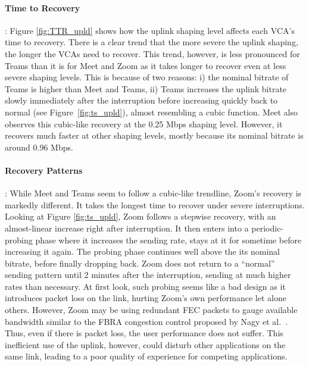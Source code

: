 \paragraph{Time to Recovery}: Figure \ref{fig:TTR_upld} shows how the uplink shaping level affects each VCA's time to recovery. There is a clear trend that the more severe the uplink shaping, the longer the VCAs need to recover. This trend, however, is less pronounced for Teams than it is for Meet and Zoom as it takes longer to recover even at less severe shaping levels. This is because of two reasons: i) the nominal bitrate of Teams is higher than Meet and Teams, ii)  Teams increases the uplink bitrate slowly immediately after the interruption before increasing quickly back to normal (see  Figure~\ref{fig:ts_upld}), almost resembling a cubic function. Meet also observes this cubic-like recovery at the 0.25 Mbps shaping level. However, it recovers much faster at other shaping levels, mostly because its nominal bitrate is around 0.96 Mbps. 

\paragraph{Recovery Patterns}: While Meet and Teams seem to follow a cubic-like trendline, Zoom's recovery is markedly different. It takes the longest time to recover under severe interruptions. Looking at Figure \ref{fig:ts_upld}, Zoom follows a stepwise recovery, with an almost-linear increase right after interruption. It then enters into a periodic-probing phase where it increases the sending rate, stays at it for sometime before increasing it again. The probing phase continues well above the its nominal bitrate, before finally dropping back. Zoom does not return to a ``normal'' sending pattern until 2 minutes after the interruption, sending at much higher rates than necessary. At first look, such probing seems like a bad design as it introduces packet loss on the link, hurting Zoom's own performance let alone others. However, Zoom may be using redundant FEC packets to gauge available bandwidth similar to the FBRA congestion control proposed by Nagy et al.~\cite{nagy2014congestion}. Thus, even if there is packet loss, the user performance does not suffer. This inefficient use of the uplink, however, could disturb other applications on the same link, leading to a poor quality of experience for competing applications. 

